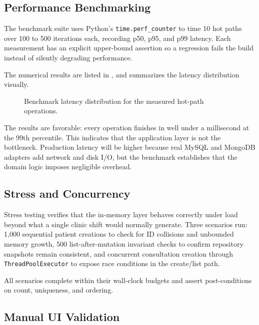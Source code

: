 \subsection{Performance Benchmarking}
\label{subsec:performance-benchmarking}

The benchmark suite uses Python's \texttt{time.perf\_counter} to time 10 hot paths over 100 to 500 iterations each, recording p50, p95, and p99 latency. Each measurement has an explicit upper-bound assertion so a regression fails the build instead of silently degrading performance.

The numerical results are listed in , and  summarizes the latency distribution visually.

\begin{figure}[htbp]
\centering
{}
\caption{Benchmark latency distribution for the measured hot-path operations.}
\label{fig:benchmark-latency}
\end{figure}
\FloatBarrier

The results are favorable: every operation finishes in well under a millisecond at the 99th percentile. This indicates that the application layer is not the bottleneck. Production latency will be higher because real MySQL and MongoDB adapters add network and disk I/O, but the benchmark establishes that the domain logic imposes negligible overhead.

\subsection{Stress and Concurrency}
\label{subsec:stress-concurrency}

Stress testing verifies that the in-memory layer behaves correctly under load beyond what a single clinic shift would normally generate. Three scenarios run: 1,000 sequential patient creations to check for ID collisions and unbounded memory growth, 500 list-after-mutation invariant checks to confirm repository snapshots remain consistent, and concurrent consultation creation through \texttt{ThreadPoolExecutor} to expose race conditions in the create/list path.

All scenarios complete within their wall-clock budgets and assert post-conditions on count, uniqueness, and ordering.

\subsection{Manual UI Validation}
\label{subsec:manual-ui-validation}

